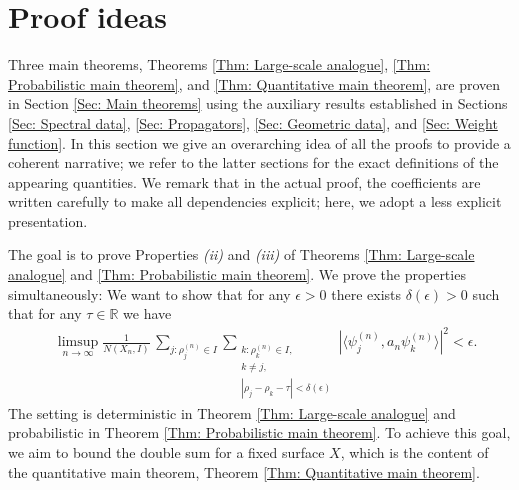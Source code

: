 \documentclass[11pt,twoside,reqno]{amsart} \usepackage{a4wide} \usepackage[T1]{fontenc} \usepackage[utf8]{inputenc} \usepackage{soul}  \usepackage{amsmath} \usepackage{amsfonts} \usepackage{amssymb} \usepackage{mathtools} \usepackage{amsthm} \usepackage{xcolor} \usepackage{graphicx} \usepackage{hyperref} \usepackage{standalone} \usepackage{esint} \usepackage{comment} \usepackage[left=2.3cm,top=3cm,right=2.3cm]{geometry} \usepackage{bm} \usepackage{svg} \usepackage{float} \numberwithin{equation}{section} \theoremstyle{plain} \newtheorem{thm}{Theorem}[section] \newtheorem{theorem}[thm]{Theorem} \newtheorem*{theorem*}{Theorem}\newtheorem{conj}[thm]{Conjecture} \newtheorem{lemma}[thm]{Lemma} \newtheorem{prop}[thm]{Proposition} \newtheorem{proposition}[thm]{Proposition} \newtheorem{cor}[thm]{Corollary} \newtheorem{question}[thm]{Question} \newtheorem{corollary}[thm]{Corollary} \newtheorem{assumption}[thm]{Assumption} \theoremstyle{definition} \newtheorem{defn}[thm]{Definition} \newtheorem{choice}[thm]{Choice} \newtheorem{definition}[thm]{Definition} \newtheorem{ex}[thm]{Example} \newtheorem{notation}[thm]{Notation} \newtheorem*{ack}{Acknowledgements} \theoremstyle{remark} \newtheorem{remark}[thm]{Remark} \newtheorem{bigremark}[thm]{Remark} \usepackage{xcolor} \newcommand{\red}[1]{ {\color{Red}#1} } \newcommand{\blue}[1]{ {\color{Blue}#1} } \author{Kai Hippi} \address{Aalto University, Espoo, Finland} \email{kai.hippi@aalto.fi}
\begin{document}


\section{Proof ideas}

\label{Sec: Strategy}

\noindent
Three main theorems, Theorems \ref{Thm: Large-scale analogue}, \ref{Thm: Probabilistic main theorem}, and \ref{Thm: Quantitative main theorem}, are proven in Section \ref{Sec: Main theorems} using the auxiliary results established in Sections \ref{Sec: Spectral data}, \ref{Sec: Propagators}, \ref{Sec: Geometric data}, and \ref{Sec: Weight function}. In this section we give an overarching idea of all the proofs to provide a coherent narrative; we refer to the latter sections for the exact definitions of the appearing quantities. We remark that in the actual proof, the coefficients are written carefully to make all dependencies explicit; here, we adopt a less explicit presentation.

The goal is to prove Properties \emph{(ii)} and \emph{(iii)} of Theorems \ref{Thm: Large-scale analogue} and \ref{Thm: Probabilistic main theorem}. We prove the properties simultaneously: We want to show that for any $ \epsilon > 0 $ there exists $ \delta( \epsilon ) > 0 $ such that for any $ \tau \in \mathbb{R} $ we have
\begin{align}
	&
	\label{Expr: Limit and double sum}
	\limsup_{n \to \infty}  \frac{1}{N( X_{n}, I )} \, \sum_{j: \rho_{j}^{( n )} \in I}^{}  \sum_{ \substack{k: \rho_{k}^{( n )} \in I, \\ k \neq j, \\  | \rho_{j} - \rho_{k} - \tau | < \delta( \epsilon )} }^{} | \langle \psi_{j}^{( n )}, a_{n} \psi_{k}^{( n )} \rangle |^{2} < \epsilon.
\end{align}
The setting is deterministic in Theorem \ref{Thm: Large-scale analogue} and probabilistic in Theorem \ref{Thm: Probabilistic main theorem}. To achieve this goal, we aim to bound the double sum for a fixed surface $ X $, which is the content of the quantitative main theorem, Theorem \ref{Thm: Quantitative main theorem}.
\end{document}
